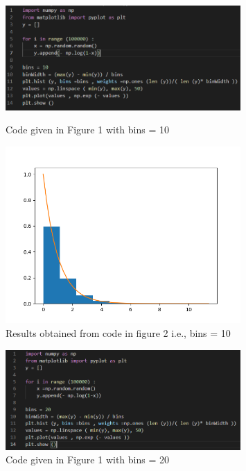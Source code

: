 \documentclass[answers]{exam}
\begin{document}
\begin{framed}
\begin{figure}[H] %
    \centering
    \includegraphics[width= 0.8\textwidth]{Q2.1_bins=10_code.PNG}
    \caption{Code given in Figure 1 with bins = 10}
    \vspace{2cm} 
    \includegraphics[width= 0.8\textwidth]{Q2.1_bins=10.png}
    \caption{Results obtained from code in figure 2 i.e., bins = 10} 
\end{figure}

\begin{figure}[H] %
    \centering
    \includegraphics[width= 0.8\textwidth]{Q2.1_bins=20_code.PNG}
    \caption{Code given in Figure 1 with bins = 20}
    

\end{figure}
\end{framed}
\end{document}
